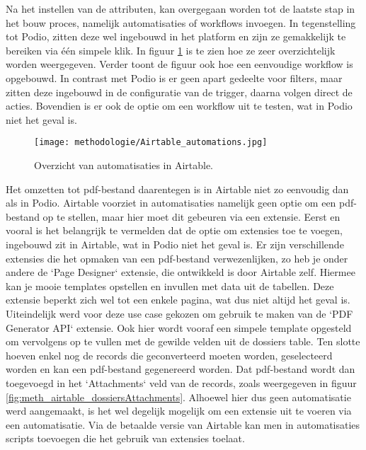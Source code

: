 Na het instellen van de attributen, kan overgegaan worden tot de laatste stap in het bouw proces, namelijk automatisaties of workflows invoegen. In tegenstelling tot Podio, zitten deze wel ingebouwd in het platform en zijn ze gemakkelijk te bereiken via één simpele klik. In figuur \ref{fig:meth_airtable_automations} is te zien hoe ze zeer overzichtelijk worden weergegeven. Verder toont de figuur ook hoe een eenvoudige workflow is opgebouwd. In contrast met Podio is er geen apart gedeelte voor filters, maar zitten deze ingebouwd in de configuratie van de trigger,  daarna volgen direct de acties. Bovendien is er ook de optie om een workflow uit te testen, wat in Podio niet het geval is. \\

\begin{figure}[ht]
    \centering
    \texttt{[image: methodologie/Airtable\_automations.jpg]}
    \caption{Overzicht van automatisaties in Airtable.}
    \label{fig:meth_airtable_automations}
\end{figure}


Het omzetten tot pdf-bestand daarentegen is in Airtable niet zo eenvoudig dan als in Podio. Airtable voorziet in automatisaties namelijk geen optie om een pdf-bestand op te stellen, maar hier moet dit gebeuren via een extensie. Eerst en vooral is het belangrijk te vermelden dat de optie om extensies toe te voegen, ingebouwd zit in Airtable, wat in Podio niet het geval is. Er zijn verschillende extensies die het opmaken van een pdf-bestand verwezenlijken, zo heb je onder andere de `Page Designer` extensie, die ontwikkeld is door Airtable zelf. Hiermee kan je mooie templates opstellen en invullen met data uit de tabellen. Deze extensie beperkt zich wel tot een enkele pagina, wat dus niet altijd het geval is. Uiteindelijk werd voor deze use case gekozen om gebruik te maken van de `PDF Generator API` extensie. Ook hier wordt vooraf een simpele template opgesteld om vervolgens op te vullen met de gewilde velden uit de dossiers table. Ten slotte hoeven enkel nog de records die geconverteerd moeten worden, geselecteerd worden en kan een pdf-bestand gegenereerd worden. Dat pdf-bestand wordt dan toegevoegd in het `Attachments` veld van de records, zoals weergegeven in figuur \ref{fig:meth_airtable_dossiersAttachments}. Alhoewel hier dus geen automatisatie werd aangemaakt, is het wel degelijk mogelijk om een extensie uit te voeren via een automatisatie. Via de betaalde versie van Airtable kan men in automatisaties scripts toevoegen die het gebruik van extensies toelaat.  \\

